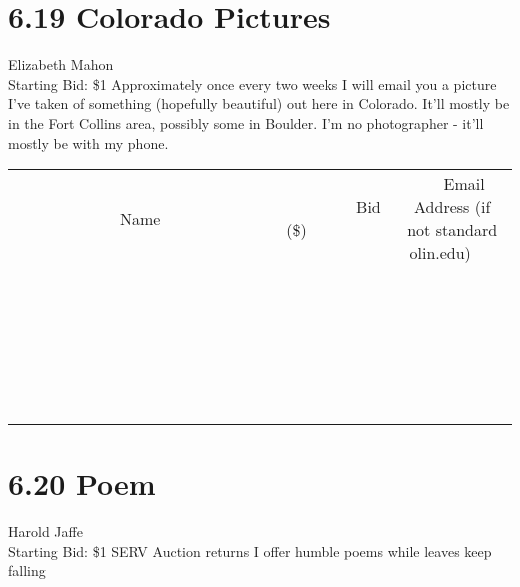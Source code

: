 \documentclass[11pt]{article}
\begin{document}
\section*{6.19 Colorado Pictures}
Elizabeth Mahon
\\
Starting Bid: \$1
\newline
Approximately once every two weeks I will email you a picture I've taken of something (hopefully beautiful) out here in Colorado. It'll mostly be in the Fort Collins area, possibly some in Boulder. I'm no photographer - it'll mostly be with my phone.
\\[6ex]
\begin{tabular}{c c c}
~~~~~~~~~~~~~Name~~~~~~~~~~~~~ & ~~~~~~~~~Bid (\$)~~~~~~~~~  & ~~~Email Address (if not standard olin.edu)~~~\\
 & & \\
\hline
 & & \\
\hline
 & & \\
\hline
 & & \\
\hline
 & & \\
\hline
 & & \\
\hline
 & & \\
\hline
 & & \\
\hline
 & & \\
\hline
 & & \\
\hline
 & & \\
\hline
 & & \\
\hline
 & & \\
\hline
 & & \\
\hline
 & & \\
\hline
 & & \\
\hline
 & & \\
\hline
 & & \\
\hline
 & & \\
\hline
 & & \\
\hline
 & & \\
\hline
 & & \\
\hline
 & & \\
\hline
 & & \\
\hline
 & & \\
\hline
 & & \\
\hline
\end{tabular}
\newpage
\section*{6.20 Poem}
Harold Jaffe
\\
Starting Bid: \$1
\newline
SERV Auction returns
I offer humble poems
while leaves keep falling
\end{document}
